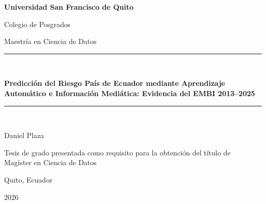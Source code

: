 \documentclass[12pt, oneside]{report}
\begin{document}
\begin{titlepage}
    \centering
    \vspace*{2cm}
    {\Large \textbf{Universidad San Francisco de Quito}\par}
    \vspace{0.5cm}
    {\large Colegio de Posgrados\par}
    {\large Maestría en Ciencia de Datos\par}
    \vspace{2cm}
    \rule{\textwidth}{1pt}\\[0.4cm]
    {\LARGE \textbf{Predicción del Riesgo País de Ecuador mediante Aprendizaje Automático e Información Mediática: Evidencia del EMBI 2013--2025}\par}
    \rule{\textwidth}{1pt}\\[2cm]
    {\large Daniel Plaza\par}
    \vspace{1cm}
    {\large Tesis de grado presentada como requisito para la obtención del título de\\ Magíster en Ciencia de Datos\par}
    \vspace{2cm}
    {\large Quito, Ecuador\par}
    {\large 2026\par}
\end{titlepage}

\setcounter{page}{2}



\tableofcontents
\listoffigures
\listoftables

\setcounter{page}{1}








\printbibliography[heading=bibintoc, title={Referencias}]

\appendix

\end{document}

